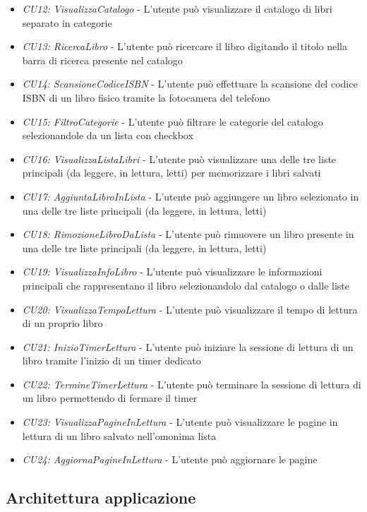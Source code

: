 \documentclass{article}
\begin{document}
\begin{itemize}[label=\textendash]
    \item \textit{CU12: VisualizzaCatalogo} - L'utente può visualizzare il catalogo di libri separato in categorie
    \item \textit{CU13: RicercaLibro} - L'utente può ricercare il libro digitando il titolo nella barra di ricerca presente nel catalogo
    \item \textit{CU14: ScansioneCodiceISBN} - L'utente può effettuare la scansione del codice ISBN di un libro fisico tramite la fotocamera del telefono
    \item \textit{CU15: FiltroCategorie} - L'utente può filtrare le categorie del catalogo selezionandole da un lista con checkbox
    \item \textit{CU16: VisualizzaListaLibri} - L'utente può visualizzare una delle tre liste principali (da leggere, in lettura, letti) per memorizzare i libri salvati
    \item \textit{CU17: AggiuntaLibroInLista} - L'utente può aggiungere un libro selezionato in una delle tre liste principali (da leggere, in lettura, letti)
    \item \textit{CU18: RimozioneLibroDaLista} - L'utente può rimuovere un libro presente in una delle tre liste principali (da leggere, in lettura, letti)
    \item \textit{CU19: VisualizzaInfoLibro} - L'utente può visualizzare le informazioni principali che rappresentano il libro selezionandolo dal catalogo o dalle liste
    \item \textit{CU20: VisualizzaTempoLettura} - L'utente può visualizzare il tempo di lettura di un proprio libro
    \item \textit{CU21: InizioTimerLettura} - L'utente può iniziare la sessione di lettura di un libro tramite l'inizio di un timer dedicato
    \item \textit{CU22: TermineTimerLettura} - L'utente può terminare la sessione di lettura di un libro permettendo di fermare il timer
    \item \textit{CU23: VisualizzaPagineInLettura} - L'utente può visualizzare le pagine in lettura di un libro salvato nell'omonima lista
    \item \textit{CU24: AggiornaPagineInLettura} - L'utente può aggiornare le pagine 
\end{itemize}

\subsection{Architettura applicazione}
\end{document}
